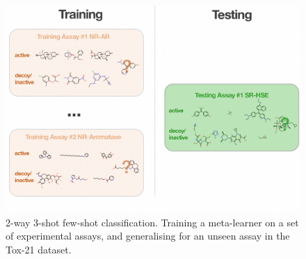 \begin{figure}
	\centering
	\includegraphics[width=0.8\linewidth]{img/tox21-metalearning.png}
	\caption{2-way 3-shot few-shot classification. Training a meta-learner on a set of experimental assays, and generalising for an unseen assay in the Tox-21 dataset.}
	\label{fig:tox21metalearning}
\end{figure}

